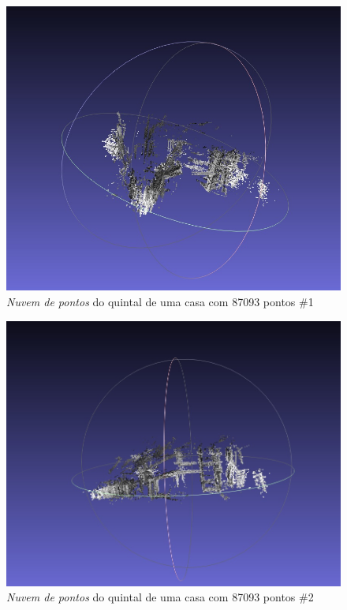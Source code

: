 \begin{figure}[H]
	\centering
		\includegraphics[width= \textwidth]{Imagens/figura4-10.jpg}
	\caption{\textit{Nuvem de pontos} do quintal de uma casa com 87093 pontos \#1}
	\label{fig4:10}
\end{figure}

\begin{figure}[H]
	\centering
		\includegraphics[width= \textwidth]{Imagens/figura4-11.jpg}
	\caption{\textit{Nuvem de pontos} do quintal de uma casa com 87093 pontos \#2}
	\label{fig4:11}
\end{figure}

